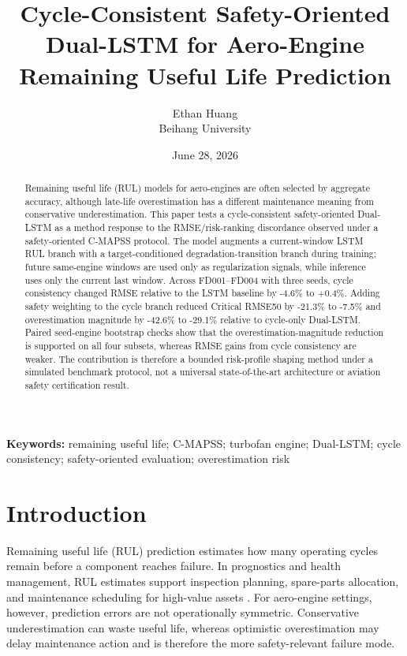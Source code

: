 \documentclass[10pt,twocolumn]{article}
\title{\textbf{Cycle-Consistent Safety-Oriented Dual-LSTM for Aero-Engine Remaining Useful Life Prediction}}
\author{Ethan Huang\\Beihang University}
\date{June 28, 2026}
\begin{document}
\maketitle

\begin{abstract}
Remaining useful life (RUL) models for aero-engines are often selected by aggregate accuracy, although late-life overestimation has a different maintenance meaning from conservative underestimation. This paper tests a cycle-consistent safety-oriented Dual-LSTM as a method response to the RMSE/risk-ranking discordance observed under a safety-oriented C-MAPSS protocol. The model augments a current-window LSTM RUL branch with a target-conditioned degradation-transition branch during training; future same-engine windows are used only as regularization signals, while inference uses only the current last window. Across FD001--FD004 with three seeds, cycle consistency changed RMSE relative to the LSTM baseline by -4.6\% to +0.4\%. Adding safety weighting to the cycle branch reduced Critical RMSE50 by -21.3\% to -7.5\% and overestimation magnitude by -42.6\% to -29.1\% relative to cycle-only Dual-LSTM. Paired seed-engine bootstrap checks show that the overestimation-magnitude reduction is supported on all four subsets, whereas RMSE gains from cycle consistency are weaker. The contribution is therefore a bounded risk-profile shaping method under a simulated benchmark protocol, not a universal state-of-the-art architecture or aviation safety certification result.
\end{abstract}

\noindent\textbf{Keywords:} remaining useful life; C-MAPSS; turbofan engine; Dual-LSTM; cycle consistency; safety-oriented evaluation; overestimation risk

\section{Introduction}
Remaining useful life (RUL) prediction estimates how many operating cycles remain before a component reaches failure. In prognostics and health management, RUL estimates support inspection planning, spare-parts allocation, and maintenance scheduling for high-value assets \citep{Jardine2006}. For aero-engine settings, however, prediction errors are not operationally symmetric. Conservative underestimation can waste useful life, whereas optimistic overestimation may delay maintenance action and is therefore the more safety-relevant failure mode.
\end{document}
